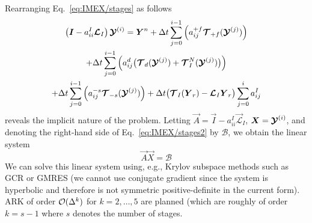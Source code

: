 \documentclass{report}
\numberwithin{equation}{section}
\begin{document}
{Rearranging Eq.~\eqref{eq:IMEX/stages} as follows 
\begin{multline}\label{eq:IMEX/stages2}
\left( \boldsymbol{{I}} - {a}^{I}_{ii}\boldsymbol{{\mathcal{L}}}_{I} \right)  \boldsymbol{{\mathcal{Y}}}^{(i)}  =  \boldsymbol{{Y}}^n + 
\Delta t \sum_{j=0}^{i-1} \left( {a}^{+f}_{ij} \boldsymbol{{\mathcal{T}}}_{+f}(\boldsymbol{{\mathcal{Y}}}^{(j)}) \right)   \\
+ \Delta t \sum_{j=0}^{i-1} \left( {a}^{d}_{ij} \bigl(\boldsymbol{{\mathcal{T}}}_{d}(\boldsymbol{{\mathcal{Y}}}^{(j)}) + \boldsymbol{{\mathcal{T}}}^N_I(\boldsymbol{{\mathcal{Y}}}^{(j)})\bigr) \right) \\
+ \Delta t \sum_{j=0}^{i-1} \left( {a}^{-s}_{ij} \boldsymbol{{\mathcal{T}}}_{-s}(\boldsymbol{{\mathcal{Y}}}^{(j)}) \right) + \Delta t \bigl(\boldsymbol{{\mathcal{T}}}_I(\boldsymbol{{Y}}_r) - \boldsymbol{{\mathcal{L}}}_I \boldsymbol{{Y}}_r \bigr) \sum_{j=0}^i a_{ij}^I
\end{multline}
reveals the implicit nature of the problem. Letting $\vec{A}=\vec{I} - {a}^{I}_{ii} \vec{\mathcal{L}}_{I}$, $\boldsymbol{{X}}=\boldsymbol{{\mathcal{Y}}}^{(i)}$, and denoting the right-hand side of Eq.~\eqref{eq:IMEX/stages2} by $\mathcal{B}$, we obtain the linear system 
\[
\vec{A} \vec{X} = \mathcal{B}
\]
We can solve this linear system using, e.g., Krylov subspace methods such as GCR or GMRES (we cannot use conjugate gradient since the system is hyperbolic and therefore is not symmetric positive-definite in the current form). ARK of order $\mathcal{O}(\Delta ^k)$ for $k=2,\ldots,5$ are planned (which are roughly of order $k=s-1$ where $s$ denotes the number of stages.
}
\end{document}
